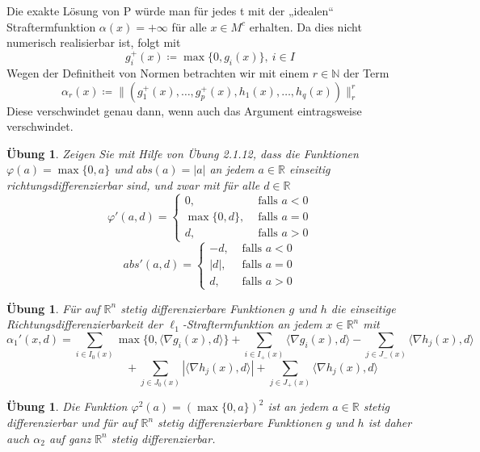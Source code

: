 \documentclass[11pt]{scrreprt}
\newcounter{thm}
\theoremstyle{thmstyle}
\numberwithin{thm}{section}
\newtheorem{uebung}[thm]{Übung}
\begin{document}
Die exakte Lösung von P würde man für jedes t mit der „idealen“ Straftermfunktion $\alpha(x) =  +\infty$ für alle $x \in M^c$ erhalten. Da dies nicht numerisch realisierbar ist, folgt mit
	$$ g_i^+(x) \coloneqq \max \{ 0, g_i(x) \}, ~ i \in I $$
Wegen der Definitheit von Normen betrachten wir mit einem $r \in \mathbb{N}$ der Term
$$ \alpha_r(x) \coloneqq \| (g_1^+(x), \dotsc, g_p^+(x), h_1(x), \dotsc, h_q(x)) \|_r^r $$
Diese verschwindet genau dann, wenn auch das Argument eintragsweise verschwindet.

\begin{uebung}
	Zeigen Sie mit Hilfe von Übung 2.1.12, dass die Funktionen $\varphi(a) = \max \{0, a\}$ und $abs(a) = |a|$ an jedem $a \in \mathbb{R}$ einseitig richtungsdifferenzierbar sind, und zwar mit für alle $d \in \mathbb{R}$ 
	$$ \varphi'(a, d) = \begin{cases}
		0, & \text{ falls } a < 0 \\
		\max \{ 0, d \}, & \text{ falls } a = 0 \\ d, & \text{ falls } a > 0
	\end{cases} $$
	$$ abs'(a, d) = \begin{cases}
		-d, & \text{ falls } a < 0 \\ |d|, & \text{ falls } a = 0 \\ d, & \text{ falls } a > 0
	\end{cases} $$
\end{uebung}

\begin{uebung}
	Für auf $\mathbb{R}^n$ stetig differenzierbare Funktionen $g$ und $h$ die einseitige Richtungsdifferenzierbarkeit der $\ell_1$-Straftermfunktion an jedem $x \in \mathbb{R}^n$ mit
	$$ \alpha_1'(x, d) = \sum_{i \in I_0(x)} \max \{ 0, \langle \nabla g_i(x), d \rangle \} + \sum_{i \in I_+(x)} \langle \nabla g_i(x), d \rangle - \sum_{j \in J_{-}(x)} \langle \nabla h_j(x), d \rangle $$
	$$  ~\hspace{3cm} + \sum_{j \in J_0(x)} |\langle \nabla h_j(x), d \rangle | + \sum_{j \in J_{+}(x)} \langle \nabla h_j(x), d \rangle $$
\end{uebung}

\begin{uebung}
	Die Funktion $\varphi^2(a) = (\max\{0, a\})^2$ ist an jedem $a \in \mathbb{R}$ stetig differenzierbar und für auf $\mathbb{R}^n$ stetig differenzierbare Funktionen $g$ und $h$ ist daher auch $\alpha_2$ auf ganz $\mathbb{R}^n$ stetig differenzierbar.
\end{uebung}
\end{document}
